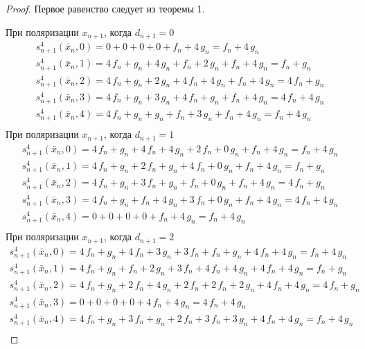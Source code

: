 \documentclass[bibliography=totoc, a4paper, 14pt]{extarticle}
\begin{document}
 \begin{proof}

Первое равенство следует из теоремы 1.

При поляризации $x_{n+1}$, когда $d_{n+1} = 0$
$$\begin{array}{l}
s_{n+1}^4(\bar{x}_n, 0) = 0 + 0 + 0 + 0 + f_n + 4\,g_n = f_n + 4\,g_n \\
s_{n+1}^4(\bar{x}_n, 1) = 4\,f_n + g_n + 4\,g_n + f_n + 2\,g_n + f_n + 4\,g_n = f_n + g_n \\
s_{n+1}^4(\bar{x}_n, 2) = 4\,f_n + g_n + 2\,g_n + 4\,f_n + 4\,g_n + f_n + 4\,g_n = 4\,f_n + g_n \\
s_{n+1}^4(\bar{x}_n, 3) = 4\,f_n + g_n + 3\,g_n + 4\,f_n + g_n + f_n + 4\,g_n = 4\,f_n + 4\,g_n \\
s_{n+1}^4(\bar{x}_n, 4) = 4\,f_n + g_n + g_n + f_n + 3\,g_n + f_n + 4\,g_n = f_n + 4\,g_n \\
\end{array}$$
При поляризации $x_{n+1}$, когда $d_{n+1} = 1$
$$\begin{array}{l}
s_{n+1}^4(\bar{x}_n, 0) = 4\,f_n + g_n + 4\,f_n + 4\,g_n + 2\,f_n + 0\,g_n + f_n + 4\,g_n = f_n + 4\,g_n \\
s_{n+1}^4(\bar{x}_n, 1) = 4\,f_n + g_n + 2\,f_n + g_n + 4\,f_n + 0\,g_n + f_n + 4\,g_n = f_n + g_n \\
s_{n+1}^4(\bar{x}_n, 2) = 4\,f_n + g_n + 3\,f_n + g_n + f_n + 0\,g_n + f_n + 4\,g_n = 4\,f_n + g_n \\
s_{n+1}^4(\bar{x}_n, 3) = 4\,f_n + g_n + f_n + 4\,g_n + 3\,f_n + 0\,g_n + f_n + 4\,g_n = 4\,f_n + 4\,g_n \\
s_{n+1}^4(\bar{x}_n, 4) = 0 + 0 + 0 + 0 + f_n + 4\,g_n = f_n + 4\,g_n \\
\end{array}$$
При поляризации $x_{n+1}$, когда $d_{n+1} = 2$
$$\begin{array}{l}
s_{n+1}^4(\bar{x}_n, 0) = 4\,f_n + g_n + 4\,f_n + 3\,g_n + 3\,f_n + f_n + g_n + 4\,f_n + 4\,g_n = f_n + 4\,g_n \\
s_{n+1}^4(\bar{x}_n, 1) = 4\,f_n + g_n + f_n + 2\,g_n + 3\,f_n + 4\,f_n + 4\,g_n + 4\,f_n + 4\,g_n = f_n + g_n \\
s_{n+1}^4(\bar{x}_n, 2) = 4\,f_n + g_n + 2\,f_n + 4\,g_n + 2\,f_n + 2\,f_n + 2\,g_n + 4\,f_n + 4\,g_n = 4\,f_n + g_n \\
s_{n+1}^4(\bar{x}_n, 3) = 0 + 0 + 0 + 0 + 4\,f_n + 4\,g_n = 4\,f_n + 4\,g_n \\
s_{n+1}^4(\bar{x}_n, 4) = 4\,f_n + g_n + 3\,f_n + g_n + 2\,f_n + 3\,f_n + 3\,g_n + 4\,f_n + 4\,g_n = f_n + 4\,g_n \\

\end{array}$$
\end{proof}
\end{document}
